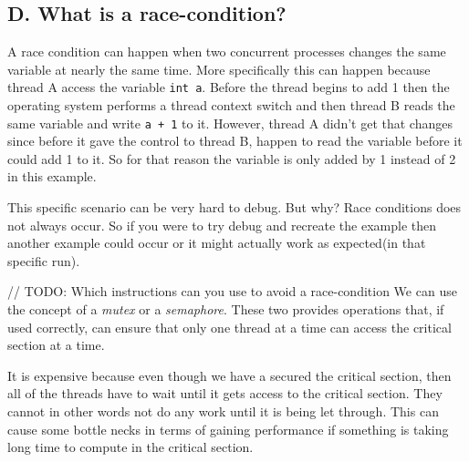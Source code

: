 \documentclass[11pt]{article}
\newcommand{\code}[1]{{\colorbox{lightgray!15}{\color{orange}\texttt{#1}}}}
\newcommand{\temp}[1]{{\color{red}#1}}
\begin{document}
\subsection{D. What is a race-condition?}
A race condition can happen when two concurrent processes changes the same variable at nearly the same time. 
More specifically this can happen because thread A access the variable \code{int a}. Before the thread begins to add 1 then the operating system performs a thread context switch and then thread B reads the same variable and write \code{a + 1} to it.
However, thread A didn't get that changes since before it gave the control to thread B, happen to read the variable before it could add 1 to it. So for that reason the variable is only added by 1 instead of 2 in this example.

This specific scenario can be very hard to debug. But why? Race conditions does not always occur. So if you were to try debug and recreate the example then another example could occur or it might actually work as expected(in that specific run).

\temp{// TODO: Which instructions can you use to avoid a race-condition}
We can use the concept of a \textit{mutex} or a \textit{semaphore}. These two provides operations that, if used correctly, can ensure that 
only one thread at a time can access the critical section at a time. 

It is expensive because even though we have a secured the critical section, then all of the threads have to wait until it gets access to
the critical section. They cannot in other words not do any work until it is being let through. This can cause some bottle necks in terms of 
gaining performance if something is taking long time to compute in the critical section.
\end{document}
